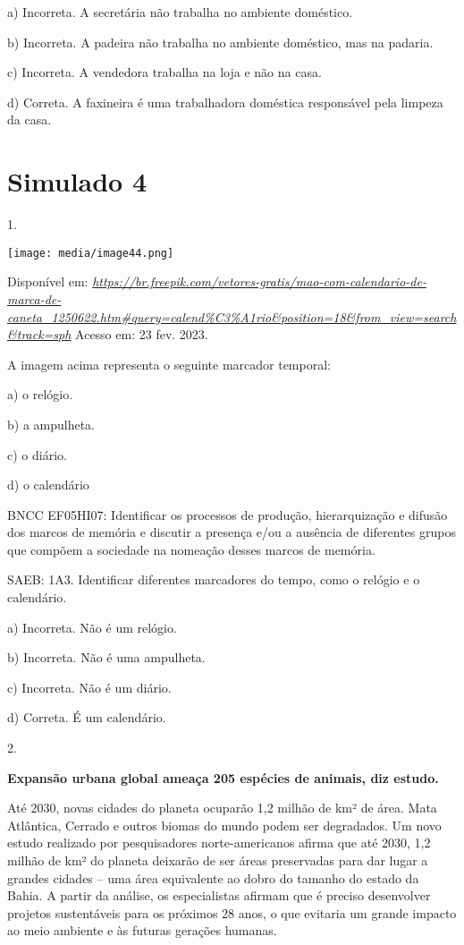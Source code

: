a) Incorreta. A secretária não trabalha no ambiente doméstico.

b) Incorreta. A padeira não trabalha no ambiente doméstico, mas na
padaria.

c) Incorreta. A vendedora trabalha na loja e não na casa.

d) Correta. A faxineira é uma trabalhadora doméstica responsável pela
limpeza da casa.

\section{Simulado 4}\label{simulado-4}

1.

\texttt{[image: media/image44.png]}

Disponível em:
\href{https://br.freepik.com/vetores-gratis/mao-com-calendario-de-marca-de-caneta_1250622.htm\#query=calend\%C3\%A1rio\&position=18\&from_view=search\&track=sph}{\emph{https://br.freepik.com/vetores-gratis/mao-com-calendario-de-marca-de-caneta\_1250622.htm\#query=calend\%C3\%A1rio\&position=18\&from\_view=search\&track=sph}}
Acesso em: 23 fev. 2023.

A imagem acima representa o seguinte marcador temporal:

a) o relógio.

b) a ampulheta.

c) o diário.

d) o calendário

BNCC EF05HI07: Identificar os processos de produção, hierarquização e
difusão dos marcos de memória e discutir a presença e/ou a ausência de
diferentes grupos que compõem a sociedade na nomeação desses marcos de
memória.

SAEB: 1A3. Identificar diferentes marcadores do tempo, como o relógio e
o calendário.

a) Incorreta. Não é um relógio.

b) Incorreta. Não é uma ampulheta.

c) Incorreta. Não é um diário.

d) Correta. É um calendário.

2.

\textbf{Expansão urbana global ameaça 205 espécies de animais, diz
estudo.}

Até 2030, novas cidades do planeta ocuparão 1,2 milhão de km² de área.
Mata Atlântica, Cerrado e outros biomas do mundo podem ser degradados.
Um novo estudo realizado por pesquisadores norte-americanos afirma que
até 2030, 1,2 milhão de km² do planeta deixarão de ser áreas preservadas
para dar lugar a grandes cidades -- uma área equivalente ao dobro do
tamanho do estado da Bahia. A partir da análise, os especialistas
afirmam que é preciso desenvolver projetos sustentáveis para os próximos
28 anos, o que evitaria um grande impacto ao meio ambiente e às futuras
gerações humanas.

